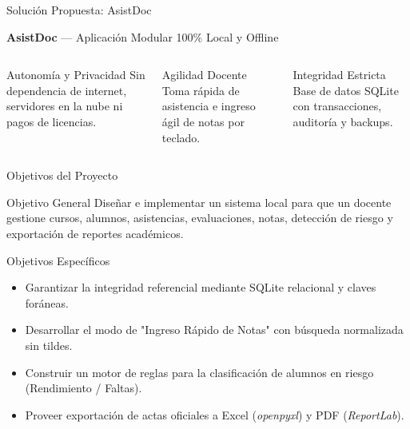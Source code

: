 \documentclass[aspectratio=169,10pt]{beamer}
\begin{document}
\begin{frame}{Solución Propuesta: AsistDoc}
  \begin{center}
    \Large \textbf{AsistDoc} — Aplicación Modular 100\% Local y Offline
  \end{center}
  \vspace{0.3cm}
  \begin{columns}
      \begin{alertblock}{Autonomía y Privacidad}
        Sin dependencia de internet, servidores en la nube ni pagos de licencias.
      \end{alertblock}
      \begin{exampleblock}{Agilidad Docente}
        Toma rápida de asistencia e ingreso ágil de notas por teclado.
      \end{exampleblock}
      \begin{block}{Integridad Estricta}
        Base de datos SQLite con transacciones, auditoría y backups.
      \end{block}
  \end{columns}
\end{frame}

\begin{frame}{Objetivos del Proyecto}
  \begin{block}{Objetivo General}
    Diseñar e implementar un sistema local para que un docente gestione cursos, alumnos, asistencias, evaluaciones, notas, detección de riesgo y exportación de reportes académicos.
  \end{block}

  \begin{block}{Objetivos Específicos}
    \begin{itemize}
      \item Garantizar la integridad referencial mediante SQLite relacional y claves foráneas.
      \item Desarrollar el modo de "Ingreso Rápido de Notas" con búsqueda normalizada sin tildes.
      \item Construir un motor de reglas para la clasificación de alumnos en riesgo (Rendimiento / Faltas).
      \item Proveer exportación de actas oficiales a Excel (\textit{openpyxl}) y PDF (\textit{ReportLab}).
    \end{itemize}
  \end{block}
\end{frame}
\end{document}
